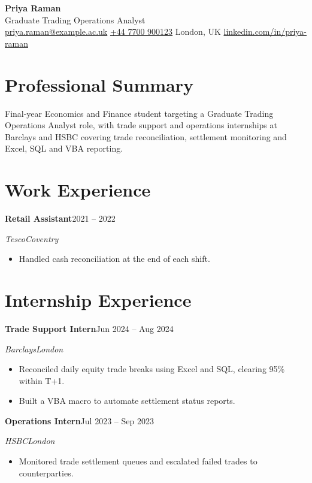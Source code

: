\documentclass[11pt,a4paper]{article}
\begin{document}
\begin{center}
  {\LARGE\bfseries Priya Raman}\\[4pt]
  {\large\color{darkgray} Graduate Trading Operations Analyst}\\[4pt]
  {\small\href{mailto:priya.raman@example.ac.uk}{priya.raman@example.ac.uk} \textbar{} \href{tel:+447700900123}{+44 7700 900123} \textbar{} London, UK \textbar{} \href{https://linkedin.com/in/priya-raman}{linkedin.com/in/priya-raman}}
\end{center}


\section*{Professional Summary}
Final-year Economics and Finance student targeting a Graduate Trading Operations Analyst role, with trade support and operations internships at Barclays and HSBC covering trade reconciliation, settlement monitoring and Excel, SQL and VBA reporting.\par

\section*{Work Experience}

\noindent\textbf{Retail Assistant}\hfill{\small 2021 -- 2022}\par\nopagebreak
\noindent\textit{Tesco}\hfill{\small\textit{Coventry}}\par
\begin{itemize}
  \item Handled cash reconciliation at the end of each shift.
\end{itemize}

\section*{Internship Experience}

\noindent\textbf{Trade Support Intern}\hfill{\small Jun 2024 -- Aug 2024}\par\nopagebreak
\noindent\textit{Barclays}\hfill{\small\textit{London}}\par
\begin{itemize}
  \item Reconciled daily equity trade breaks using Excel and SQL, clearing 95\% within T+1.
  \item Built a VBA macro to automate settlement status reports.
\end{itemize}
\vspace{6pt}
\noindent\textbf{Operations Intern}\hfill{\small Jul 2023 -- Sep 2023}\par\nopagebreak
\noindent\textit{HSBC}\hfill{\small\textit{London}}\par
\begin{itemize}
  \item Monitored trade settlement queues and escalated failed trades to counterparties.
\end{itemize}
\end{document}

